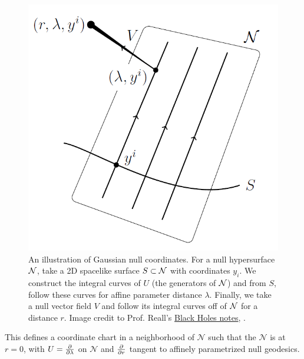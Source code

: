 \begin{figure}
    \centering
    \includegraphics{2019/02/20190220_reall_gaussiannullcoords.png}
    \caption{An illustration of Gaussian null coordinates. For a null hypersurface $\cN$, take a 2D spacelike surface $S\subset \cN$ with coordinates $y_i$. We construct the integral curves of $U$ (the generators of $\cN$) and from $S$, follow these curves for affine parameter distance $\lambda$. Finally, we take a null vector field $V$ and follow its integral curves off of $\cN$ for a distance $r$.\newline
    Image credit to Prof. Reall's  \href{http://www.damtp.cam.ac.uk/user/hsr1000/black_holes_lectures_2016.pdf}{Black Holes notes}, .
    }
    \label{fig:gaussiannullcoords}
\end{figure}

This defines a coordinate chart in a neighborhood of $\mathcal{N}$ such that the $\mathcal{N}$ is at $r=0$, with $U=\P{}{\lambda}$ on $\mathcal{N}$ and $\P{}{r}$ tangent to affinely parametrized null geodesics.


